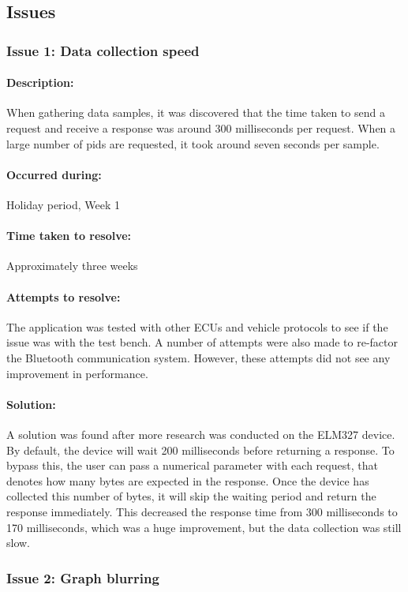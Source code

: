 	\subsection{Issues}{		
		\subsubsection{Issue 1: Data collection speed}{
			\paragraph{Description:}
			When gathering data samples, it was discovered that the time taken to send a request and receive a response was around 300 milliseconds per request. When a large number of pids are requested, it took around seven seconds per sample.
			\paragraph{Occurred during:}
			Holiday period, Week 1
			\paragraph{Time taken to resolve:}
			Approximately three weeks
			\paragraph{Attempts to resolve:}
			The application was tested with other ECUs and vehicle protocols to see if the issue was with the test bench. A number of attempts were also made to re-factor the Bluetooth communication system. However, these attempts did not see any improvement in performance.
			\paragraph{Solution:}
			A solution was found after more research was conducted on the ELM327 device. By default, the device will wait 200 milliseconds before returning a response. To bypass this, the user can pass a numerical parameter with each request, that denotes how many bytes are expected in the response. Once the device has collected this number of bytes, it will skip the waiting period and return the response immediately. This decreased the response time from 300 milliseconds to 170 milliseconds, which was a huge improvement, but the data collection was still slow.
		\subsubsection{Issue 2: Graph blurring}{
}}}
